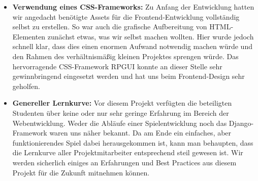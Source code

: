 \begin{itemize}
    \item \textbf{Verwendung eines CSS-Frameworks:} Zu Anfang der Entwicklung hatten wir angedacht benötigte Assets für die Frontend-Entwicklung vollständig selbst zu erstellen. So war auch die grafische Aufbereitung von HTML-Elementen zunächst etwas, was wir selbst machen wollten. Hier wurde jedoch schnell klar, dass dies einen enormen Aufwand notwendig machen würde und den Rahmen des verhältnismäßig kleinen Projektes sprengen würde. Das hervorragende CSS-Framework RPGUI konnte an dieser Stelle sehr gewinnbringend eingesetzt werden und hat uns beim Frontend-Design sehr geholfen.
    
    \item \textbf{Genereller Lernkurve:} Vor diesem Projekt verfügten die beteiligten Studenten über keine oder nur sehr geringe Erfahrung im Bereich der Webentwicklung. Weder die Abläufe einer Spielentwicklung noch das Django-Framework waren uns näher bekannt. Da am Ende ein einfaches, aber funktionierendes Spiel dabei herausgekommen ist, kann man behaupten, dass die Lernkurve aller Projektmitarbeiter entsprechend steil gewesen ist. Wir werden sicherlich einiges an Erfahrungen und Best Practices aus diesem Projekt für die Zukunft mitnehmen können.   
\end{itemize}

